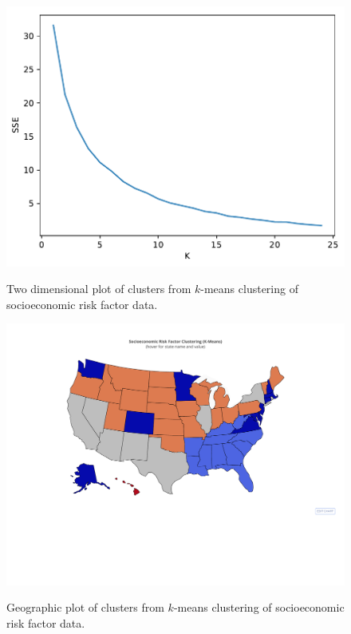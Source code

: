 \documentclass{article}
\begin{document}
\begin{figure}[h]
\centering
\caption{Two dimensional plot of clusters from $k$-means clustering of socioeconomic risk factor data.}
\includegraphics[width=\linewidth]{images/socioeconomic_risk_factors_kmeans_objc_tuning.pdf}
\label{fig:kmeanssocioscat}
\end{figure}

\begin{figure}[h]
\centering
\caption{Geographic plot of clusters from $k$-means clustering of socioeconomic risk factor data.}
\includegraphics[width=\linewidth]{images/socioeconomic_risk_factor_kmeans_map.pdf}
\label{fig:kmeanssociomap}
\end{figure}
\end{document}
